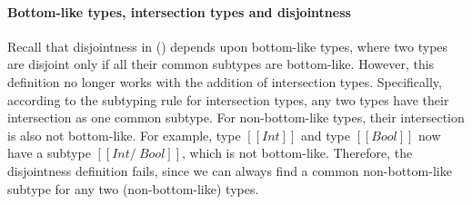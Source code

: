 \paragraph{Bottom-like types, intersection types and disjointness}
\noindent %
Recall that disjointness in  () depends
upon bottom-like types, where two types are disjoint only if all their common
subtypes are bottom-like. However, this definition no longer works with the
addition of intersection types. Specifically, according to the subtyping rule
for intersection types, any two types have their intersection as one common subtype.
For non-bottom-like types, their intersection is also not bottom-like. For
example, type $[[Int]]$ and type $[[Bool]]$ now have a subtype $[[Int /\ Bool]]$,
which is not bottom-like. Therefore, the disjointness definition fails, since we
can always find a common non-bottom-like subtype for any two (non-bottom-like)
types.

\begin{comment}
Reader may think at this point to add intersection of non-overlapping types such as $[[Int /\ Bool]]$
in bottom-like types to solve the problem. A trivial and intuitive approach to think of is:

\begin{center}
\drule[]{bl-andsub}
\end{center}

\noindent \Rref{bl-andsub} states that if two types $[[A]]$ and $[[B]]$
are not subtypes of each other (i.e. non-overlapping) then intersection of
such types $[[A /\ B]]$ is bottom-like.
\Rref{bl-andsub} works for simple cases such as $[[Int]]$ and $[[Bool]]$.
But it fails if  $[[A]]$ = $[[Int /\ Bool]]$ and 
$[[B]]$ = $[[Int /\ Bool]]$.
Because $[[A]]$ ($[[Int /\ Bool]]$) and $[[B]]$ ($[[Int /\ Bool]]$) are subtypes
of each other and are not bottom-like as per \rref{bl-andsub}.
So, naive addition of \rref{bl-andsub} skips potential bottem-like types.
Another alternative may be:

\begin{center}
\drule[]{bl-anddisj}
\end{center}

\noindent \Rref{bl-anddisj} states that if two types $[[A]]$ and $[[B]]$ are disjoint,
then intersection of such types $[[A /\ B]]$ is bottom-like.
But \rref{bl-anddisj} imposes additional complexities of mutually
dependent definitions among disjointness and bottom-like.
This makes completeness challenging or even impossible to prove.
\end{comment}
